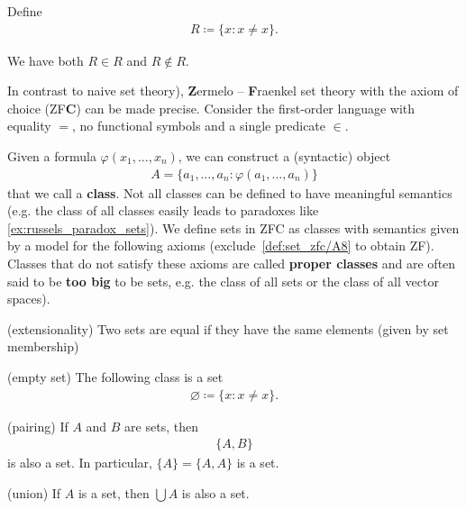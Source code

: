 \begin{example}\label{ex:russels_paradox_sets}
  Define
  \begin{align*}
    R \coloneqq \{ x \colon x \neq x \}.
  \end{align*}

  We have both \( R \in R \) and \( R \not\in R \).
\end{example}

\begin{definition}\label{def:set_zfc}\cite[271]{Enderton1977}
  In contrast to naive set theory), \textbf{Z}ermelo – \textbf{F}raenkel set theory with the axiom of choice (ZF\textbf{C}) can be made precise. Consider the first-order language with equality \( = \), no functional symbols and a single predicate \( \in \).

  Given a formula \( \varphi(x_1, \ldots, x_n) \), we can construct a (syntactic) object
  \begin{align*}
    A = \{ a_1, \ldots, a_n \colon \varphi(a_1, \ldots, a_n) \}
  \end{align*}
  that we call a \textbf{class}. Not all classes can be defined to have meaningful semantics (e.g. the class of all classes easily leads to paradoxes like \cref{ex:russels_paradox_sets}). We define sets in ZFC as classes with semantics given by a model for the following axioms (exclude~\ref{def:set_zfc/A8} to obtain ZF). Classes that do not satisfy these axioms are called \textbf{proper classes} and are often said to be \textbf{too big} to be sets, e.g. the class of all sets or the class of all vector spaces).

  \begin{description}
    (extensionality) Two sets are equal if they have the same elements (given by set membership)

    (empty set) The following class is a set
    \begin{align*}
      \varnothing \coloneqq \{ x \colon x \neq x \}.
    \end{align*}

    (pairing) If \( A \) and \( B \) are sets, then
    \begin{align*}
      \{ A, B \}
    \end{align*}
    is also a set. In particular, \( \{ A \} = \{ A, A \} \) is a set.

    (union) If \( A \) is a set, then \( \bigcup A \) is also a set.


\end{description}
\end{definition}
